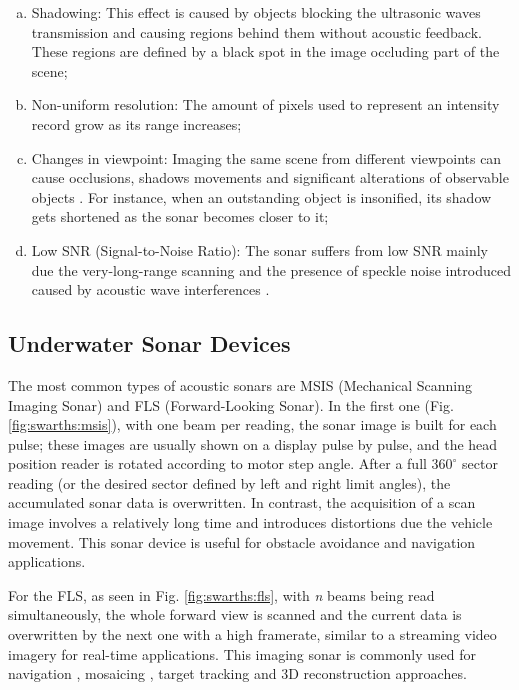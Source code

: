 \documentclass[final,5p,times]{elsarticle}
\begin{document}
\begin{enumerate}[(a)]
    \item Shadowing: This effect is caused by objects blocking the ultrasonic waves transmission and causing regions behind them without acoustic feedback. These regions are defined by a black spot in the image occluding part of the scene;
    \item Non-uniform resolution: The amount of pixels used to represent an intensity record grow as its range increases;
    \item Changes in viewpoint: Imaging the same scene from different viewpoints can cause occlusions, shadows movements and significant alterations of observable objects \cite{hurtos2014b}. For instance, when an outstanding object is insonified, its shadow gets shortened as the sonar becomes closer to it;
    \item Low SNR (Signal-to-Noise Ratio): The sonar suffers from low SNR mainly due the very-long-range scanning and the presence of speckle noise introduced caused by acoustic wave interferences \cite{abbott1973}.
\end{enumerate}


\subsection{Underwater Sonar Devices}
\label{sonar:devices}

The most common types of acoustic sonars are MSIS (Mechanical Scanning Imaging Sonar) and FLS (Forward-Looking Sonar). In the first one (Fig. \ref{fig:swarths:msis}), with one beam per reading, the sonar image is built for each pulse; these images are usually shown on a display pulse by pulse, and the head position reader is rotated according to motor step angle. After a full $360^{\circ}$ sector reading (or the desired sector defined by left and right limit angles), the accumulated sonar data is overwritten. In contrast, the acquisition of a scan image involves a relatively long time and introduces distortions due the vehicle movement. This sonar device is useful for obstacle avoidance \cite{ganesan2015} and navigation \cite{ribas2010} applications.

For the FLS, as seen in Fig. \ref{fig:swarths:fls}, with \textit{n} beams being read simultaneously, the whole forward view is scanned and the current data is overwritten by the next one with a high framerate, similar to a streaming video imagery for real-time applications. This imaging sonar is commonly used for navigation \cite{fallon2013}, mosaicing \cite{hurtos2014a}, target tracking \cite{liu2016} and 3D reconstruction \cite{huang2015} approaches.
\end{document}
